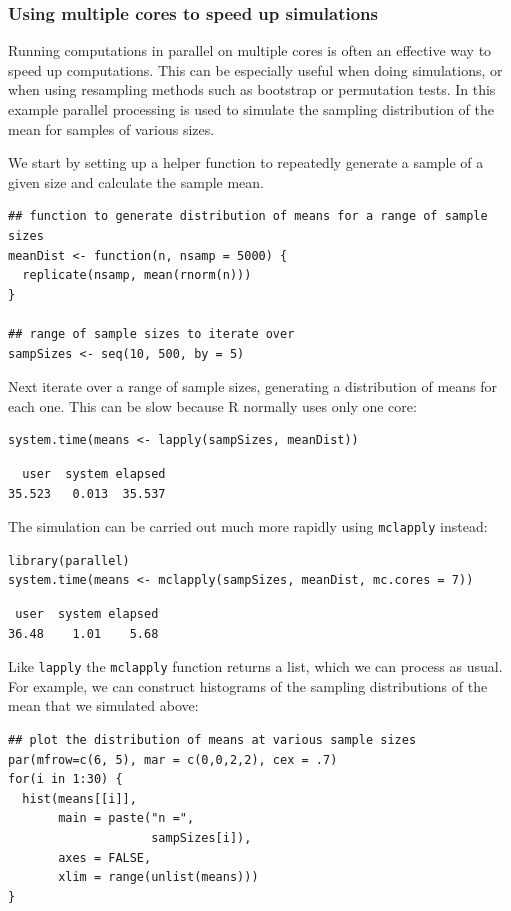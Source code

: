 \documentclass[11pt]{article}
\begin{document}
\subsubsection{Using multiple cores to speed up simulations}
\label{sec-6-3-1}
Running computations in parallel on multiple cores is often an effective way to speed up computations. This can be especially useful when doing simulations, or when using resampling methods such as bootstrap or permutation tests. In this example parallel processing is used to simulate the sampling distribution of the mean for samples of various sizes.

We start by setting up a helper function to repeatedly generate a sample of a given size and calculate the sample mean.
\begin{verbatim}
## function to generate distribution of means for a range of sample sizes
meanDist <- function(n, nsamp = 5000) {
  replicate(nsamp, mean(rnorm(n)))
}

## range of sample sizes to iterate over
sampSizes <- seq(10, 500, by = 5)
\end{verbatim}

Next iterate over a range of sample sizes, generating a distribution of means for each one. This can be slow because R normally uses only one core:
\begin{verbatim}
system.time(means <- lapply(sampSizes, meanDist))
\end{verbatim}

\begin{verbatim}
  user  system elapsed 
35.523   0.013  35.537
\end{verbatim}

The simulation can be carried out much more rapidly using \texttt{mclapply} instead:
\begin{verbatim}
library(parallel) 
system.time(means <- mclapply(sampSizes, meanDist, mc.cores = 7))
\end{verbatim}

\begin{verbatim}
 user  system elapsed 
36.48    1.01    5.68
\end{verbatim}

Like \texttt{lapply} the \texttt{mclapply} function returns a list, which we can process as usual. For example, we can construct histograms of the sampling distributions of the mean that we simulated above:
\begin{verbatim}
## plot the distribution of means at various sample sizes
par(mfrow=c(6, 5), mar = c(0,0,2,2), cex = .7)
for(i in 1:30) {
  hist(means[[i]], 
       main = paste("n =", 
                    sampSizes[i]), 
       axes = FALSE,
       xlim = range(unlist(means)))
}
\end{verbatim}
\end{document}

